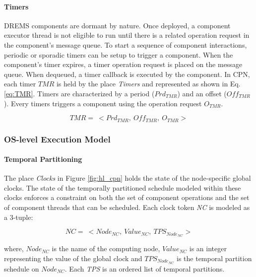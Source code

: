 \paragraph{Timers}

DREMS components are dormant by nature. Once deployed, a component executor thread is not eligible to run until there is a related operation request in the component's message queue. To start a sequence of component interactions, periodic or sporadic timers can be setup to trigger a component. When the component's timer expires, a timer operation request is placed on the message queue. When dequeued, a timer callback is executed by the component. In CPN, each timer $TMR$ is held by the place \emph{Timers} and represented as shown in Eq. \ref{eq:TMR}. Timers are characterized by a period ($Prd_{TMR}$) and an offset ($Off_{TMR}$). Every timers triggers a component using the operation request $O_{TMR}$.

\vspace{-0.1in}
\begin{equation}
\label{eq:TMR}
TMR = \ < Prd_{TMR}, \ Off_{TMR}, \ O_{TMR}>
\end{equation}

\subsubsection{OS-level Execution Model}

\paragraph{Temporal Partitioning}
The place \emph{Clocks} in Figure \ref{fig:hl_cpn} holds the state of the node-specific global clocks. The state of the temporally partitioned schedule modeled within these clocks enforces a constraint on both the set of component operations and the set of component threads that can be scheduled. Each clock token \emph{NC} is modeled as a 3-tuple:

\vspace{-0.1in}
\begin{equation}
\label{eq:NC}
NC = \ < Node_{NC}, \ Value_{NC}, \ TPS_{Node_{NC}} >
\end{equation}

where, $Node_{NC}$ is the name of the computing node, $Value_{NC}$ is an integer representing the value of the global clock and $TPS_{Node_{NC}}$ is the temporal partition schedule on $Node_{NC}$. Each \emph{TPS} is an ordered list of temporal partitions.

